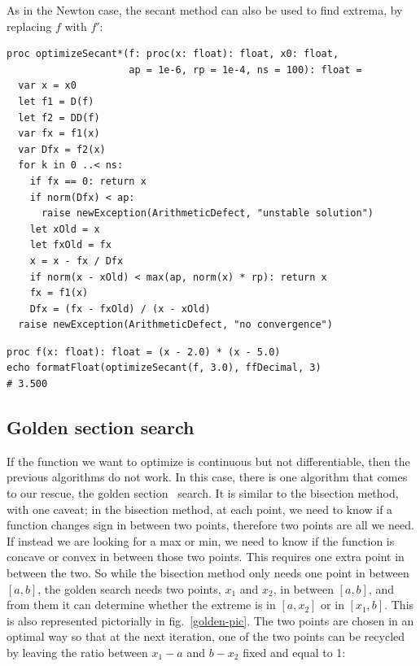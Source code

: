 \documentclass[justified, sixbynine]{tufte-book}
\def\ft{\small\tt}
\theoremstyle{plain}%
\newtheorem * {corollary}{Corollary}
\theoremstyle{definition}
\theoremstyle{remark}
\newtheorem * {remark}{Remark}
\newtheorem * {note}{Note}
\begin{document}
\begin{fullwidth}

As in the Newton case, the secant method can also be used to find extrema, by replacing $f$ with $f'$:

\begin{lstlisting}[caption={in file: {\ft nlib.nim}}]
proc optimizeSecant*(f: proc(x: float): float, x0: float,
                     ap = 1e-6, rp = 1e-4, ns = 100): float =
  var x = x0
  let f1 = D(f)
  let f2 = DD(f)
  var fx = f1(x)
  var Dfx = f2(x)
  for k in 0 ..< ns:
    if fx == 0: return x
    if norm(Dfx) < ap:
      raise newException(ArithmeticDefect, "unstable solution")
    let xOld = x
    let fxOld = fx
    x = x - fx / Dfx
    if norm(x - xOld) < max(ap, norm(x) * rp): return x
    fx = f1(x)
    Dfx = (fx - fxOld) / (x - xOld)
  raise newException(ArithmeticDefect, "no convergence")
\end{lstlisting}

\begin{lstlisting}
proc f(x: float): float = (x - 2.0) * (x - 5.0)
echo formatFloat(optimizeSecant(f, 3.0), ffDecimal, 3)
# 3.500
\end{lstlisting}

\goodbreak\subsection{Golden section search}


If the function we want to optimize is continuous but not differentiable, then the previous algorithms do not work. In this case, there is one algorithm that comes to our rescue, the golden section~\cite{golden} search. It is similar to the bisection method, with one caveat; in the bisection method, at each point, we need to know if a function changes sign in between two points, therefore two points are all we need. If instead we are looking for a max or min, we need to know if the function is concave or convex in between those two points. This requires one extra point in between the two. So while the bisection method only needs one point in between $[a, b]$, the golden search needs two points, $x_1$ and $x_2$, in between $[a, b]$, and from them it can determine whether the extreme is in $[a, x_2]$ or in $[x_1, b]$. This is also represented pictorially in fig.~\ref{golden-pic}. The two points are chosen in an optimal way so that at the next iteration, one of the two points can be recycled by leaving the ratio between $x_1-a$ and $b-x_2$ fixed and equal to 1:


\end{fullwidth}
\end{document}
